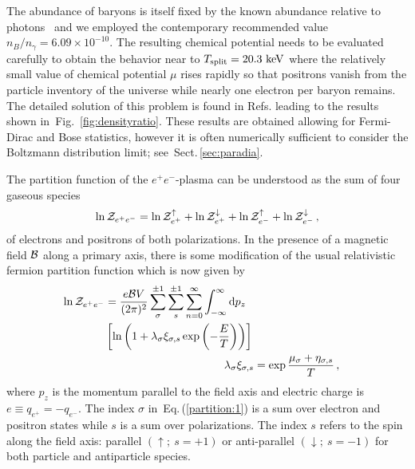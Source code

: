 \documentclass[aps,prd,floatfix,reprint]{revtex4-2}
\newcommand*{\keV}{\text{ keV}}
\newcommand{\req}[1]{Eq.\,(\ref{#1})}
\newcommand{\rf}[1]{Fig.~{\ref{#1}}}
\newcommand{\rsec}[1]{Sect.\,{\ref{#1}}}
\begin{document}
The abundance of baryons is itself fixed by the known abundance relative to photons~\cite{ParticleDataGroup:2022pth} and we employed the contemporary recommended value $n_B/n_\gamma=6.09\times 10^{-10}$. The resulting chemical potential needs to be evaluated carefully to obtain the behavior near to $T_{\rm split}=20.3\keV$ where the relatively small value of chemical potential $\mu$ rises rapidly so that positrons vanish from the particle inventory of the universe while nearly one electron per baryon remains. The detailed solution of this problem is found in Refs.\;\cite{Fromerth:2012fe,Rafelski:2023emw} leading to the results shown in~\rf{fig:densityratio}. These results are obtained allowing for Fermi-Dirac and Bose statistics, however it is often numerically sufficient to consider the Boltzmann distribution limit; see~\rsec{sec:paradia}.

The partition function of the $e^{+}e^{-}$-plasma can be understood as the sum of four gaseous species
\begin{align}
 \label{partition:0} 
 \ln{\cal Z}_{e^{+}e^{-}}=\ln{\cal Z}_{e^{+}}^{\uparrow}+\ln{\cal Z}_{e^{+}}^{\downarrow}+\ln{\cal Z}_{e^{-}}^{\uparrow}+\ln{\cal Z}_{e^{-}}^{\downarrow}\,,
\end{align}
of electrons and positrons of both polarizations. In the presence of a magnetic field ${\cal B}$ along a primary axis, there is some modification of the usual relativistic fermion partition function which is now given by
\begin{align}
 \begin{split}
 \label{partition:1}
 \ln{\cal Z}_{e^{+}e^{-}}&=\frac{e{\cal B}V}{(2\pi)^{2}}\sum_{\sigma}^{\pm1}\sum_{s}^{\pm1}\sum_{n=0}^{\infty}\int_{-\infty}^{\infty}{\rm d}p_{z}\\
 &\left[\ln\left(1+\lambda_{\sigma}\xi_{\sigma,s}\exp\left(-\frac{E}{T}\right)\right)\right]\, 
 \end{split}\\
 \label{partition:2} 
 \lambda_{\sigma}\xi_{\sigma, s} &= \exp{\frac{\mu_{\sigma}+\eta_{\sigma,s}}{T}}\,,
\end{align}
where $p_{z}$ is the momentum parallel to the field axis and electric charge is $e\equiv q_{e^{+}}=-q_{e^{-}}$. The index $\sigma$ in~\req{partition:1} is a sum over electron and positron states while $s$ is a sum over polarizations. The index $s$ refers to the spin along the field axis: parallel $(\uparrow;\ s=+1)$ or anti-parallel $(\downarrow;\ s=-1)$ for both particle and antiparticle species.
\end{document}
